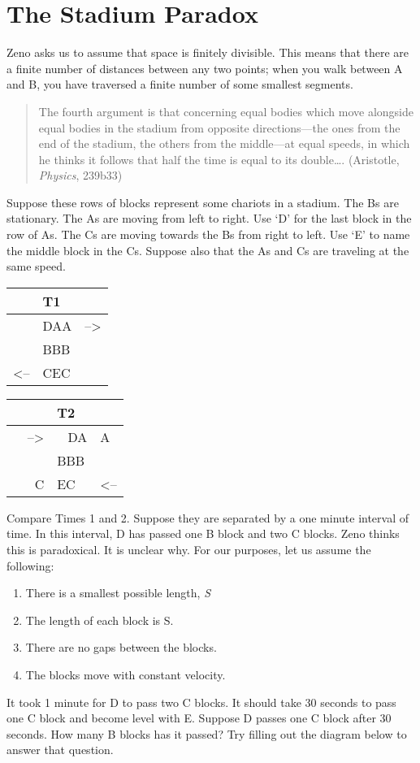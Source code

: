 \documentclass[oneside]{article}
\begin{document}
\section{The Stadium Paradox}\label{stadium-paradox}

Zeno asks us to assume that space is finitely divisible. This means that there are a finite number of distances between any two points; when you walk between A and B, you have traversed a finite number of some smallest segments. 



\begin{quote}
The fourth argument is that concerning equal bodies which move alongside equal bodies in the stadium from opposite directions---the ones from the end of the stadium, the others from the middle---at equal speeds, in which he thinks it follows that half the time is equal to its
double\ldots{}. (Aristotle, \emph{Physics}, 239b33)
\end{quote}
Suppose these rows of blocks represent some chariots in a stadium. The
Bs are stationary. The As are moving from left to right. Use `D' for the last block in the row of As. The Cs are moving towards the Bs from right to left. Use `E' to name the middle block in the Cs. Suppose also that the As and Cs are traveling at the same speed.

\begin{longtable}[c]{@{}lll@{}}
\toprule
& T1 &\tabularnewline
\midrule
\endhead
& DAA & --\textgreater{}\tabularnewline
& BBB &\tabularnewline
\textless{}-- & CEC &\tabularnewline
\bottomrule
\end{longtable}

\begin{longtable}[c]{@{}rll@{}}
\toprule
& T2 &\tabularnewline
\midrule
\endhead
--\textgreater{} & ~ DA & A\tabularnewline
& BBB &\tabularnewline
~ ~ C & EC~ & \textless{}--\tabularnewline
\bottomrule
\end{longtable}
Compare Times 1 and 2. Suppose they are separated by a one minute
interval of time. In this interval, D has passed one B block and two C blocks. Zeno thinks this is paradoxical. It is unclear why. For our purposes, let us assume the following:

\begin{enumerate}
\item
  There is a smallest possible length, \emph{S}
\item
  The length of each block is S.
\item
  There are no gaps between the blocks.
\item
  The blocks move with constant velocity.
\end{enumerate}
It took 1 minute for D to pass two C blocks. It should take 30 seconds to
pass one C block and become level with E. Suppose D passes one C block after 30 seconds. How many B blocks has it passed? Try filling out the diagram below to answer that question.
\end{document}
